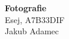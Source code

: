 \documentclass[11pt,a4paper]{article}
\begin{document}
    \begin{center}
        \Huge \textbf{Fotografie} \\ 
        \normalsize Esej, A7B33DIF \\
        Jakub Adamec
    \end{center}
\end{document}
